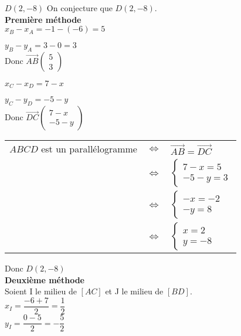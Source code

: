 $D\left(2,-8\right)$ On conjecture que $D\left(2,-8\right)$.\\

\textbf{Première méthode}\\

$x_B - x_A = -1 -\left(-6\right) = 5 $

$ y_B - y_A = 3 - 0 = 3 $\\

Donc $\overrightarrow{AB}\left(\begin{array}{c} 5\\ 3 \end{array}\right)$

$x_C - x_D = 7 - x$

$ y_C - y_D = -5 - y $ \\


Donc $\overrightarrow{DC}\left(\begin{array}{c} 7-x\\ -5-y \end{array}\right)$


\begin{tabular}{lll}
$ABCD$ est un parallélogramme & $\Longleftrightarrow$ & $\overrightarrow{AB} = \overrightarrow{DC} $ \\
& $\Longleftrightarrow$ & $ \begin{cases} 7 - x = 5 \\ -5 - y = 3 \end{cases}$ \\
& $ \Longleftrightarrow$ & $ \begin{cases} -x = -2 \\ -y = 8 \end{cases} $ \\
& $\Longleftrightarrow$ & $ \begin{cases}x = 2 \\ y = -8 \end{cases} $ \\
\end{tabular}

Donc $D\left(2,-8\right)$\\

\textbf{Deuxième méthode}\\
Soient I le milieu de $ \left[AC\right] $ et J le milieu de $\left[BD\right]$.\\

$x_I = \dfrac{-6 + 7}{2} = \dfrac{1}{2} $\\

$ y_I = \dfrac{0-5}{2} = -\dfrac{5}{2} $\\

